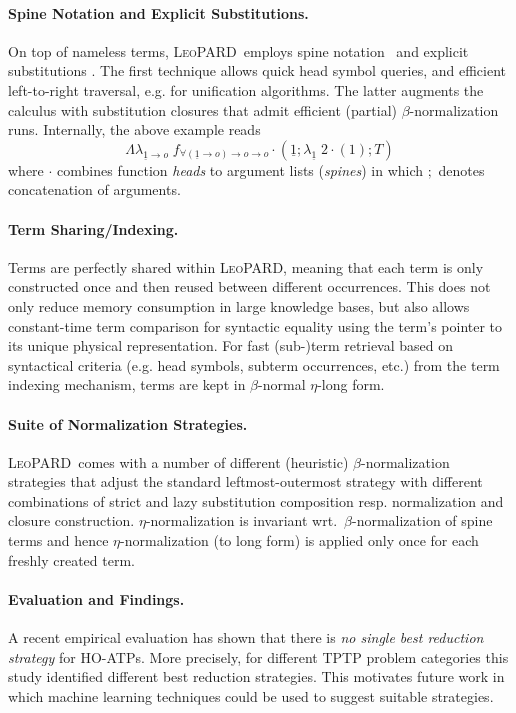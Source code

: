 \documentclass{llncs}
\def\sys{\mbox{\textsc{LeoPARD}}}
\begin{document}
\paragraph{Spine Notation and Explicit Substitutions.} On top of nameless terms,
\sys\ employs spine notation~\cite{CP03} and explicit substitutions
\cite{Explicit}. The first technique allows quick head symbol
queries, and efficient left-to-right traversal, e.g. for unification
algorithms. The latter augments the calculus with substitution closures that admit
efficient (partial) $\beta$-normalization runs. Internally, the above example reads
\[\Lambda \lambda_{\underline{1} \to o}\; f_{\forall(\underline{1} \to o)\to o \to o} \cdot (\underline{1};\lambda_{\underline{1}}\; 2 \cdot (1);T)\] where $\cdot$ combines function \emph{heads} to argument lists (\emph{spines}) in which
$;$ denotes concatenation of arguments.

\paragraph{Term Sharing/Indexing.} Terms are perfectly shared within
\sys, meaning that each term is only constructed once and then reused
between different occurrences. This does not only reduce memory
consumption in large knowledge bases, but also allows constant-time
term comparison for syntactic equality using the term's pointer to its
unique physical representation. For fast (sub-)term retrieval based on
syntactical criteria (e.g. head symbols, subterm occurrences, etc.)
from the term indexing mechanism, terms are kept in
$\beta$-normal $\eta$-long form.


\paragraph{Suite of Normalization Strategies.} \sys\ comes with a
number of different (heuristic) $\beta$-normalization strategies that
adjust the standard leftmost-outermost strategy with different
combinations of strict and lazy substitution composition
resp. normalization and closure construction. $\eta$-normalization is
invariant wrt.~$\beta$-normalization of spine terms and hence
$\eta$-normalization (to long form) is applied only once for each
freshly created term.


\paragraph{Evaluation and Findings.} A recent empirical evaluation
\cite{SteenMSc} has shown that there is \textit{no single best
  reduction strategy} for HO-ATPs. More precisely, for different TPTP
problem categories this study identified different best reduction
strategies. This motivates future work in which machine learning
techniques could be used to suggest suitable strategies.
\end{document}
